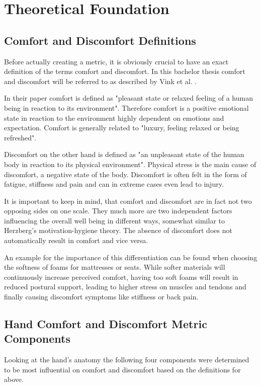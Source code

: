 \chapter{Theoretical Foundation}\label{chapter:theory}

\section{Comfort and Discomfort Definitions}

Before actually creating a metric, it is obviously crucial to have an exact definition of the terms comfort and discomfort. In this bachelor thesis comfort and discomfort will be referred to as described by Vink et al. \cite{vink2012editorial}.

In their paper comfort is defined as "pleasant state or relaxed feeling of a human being in reaction to its environment". Therefore comfort is a positive emotional state in reaction to the environment highly dependent on emotions and expectation. Comfort is generally related to "luxury, feeling relaxed or being refreshed".

Discomfort on the other hand is defined as "an unpleasant state of the human body in reaction to its physical environment". Physical stress is the main cause of discomfort, a negative state of the body. Discomfort is often felt in the form of fatigue, stiffness and pain and can in extreme cases even lead to injury.

It is important to keep in mind, that comfort and discomfort are in fact not two opposing sides on one scale. They much more are two independent factors influencing the overall well being in different ways, somewhat similar to Herzberg's motivation-hygiene theory. The absence of discomfort does not automatically result in comfort and vice versa. 

An example for the importance of this differentiation can be found when choosing the softness of foams for mattresses or seats. While softer materials will continuously increase perceived comfort, having too soft foams will result in reduced postural support, leading to higher stress on muscles and tendons and finally causing discomfort symptoms like stiffness or back pain. 

\section{Hand Comfort and Discomfort Metric Components}

Looking at the hand's anatomy the following four components were determined to be most influential on comfort and discomfort based on the definitions for above. 

